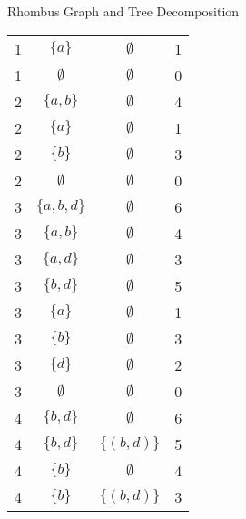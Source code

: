 \documentclass{beamer}
\begin{document}
\begin{frame}{Rhombus Graph and Tree Decomposition}
\begin{minipage}{0.35\textwidth}
\begin{tabular}{|c| >{\small}c | >{\small}c | >{\small}c |}
    \hline
    1 & \( \{ a \} \) & \( \emptyset \) & 1 \\
    1 & \( \emptyset \) & \( \emptyset \) & 0 \\
    \hline
    2 & \( \{ a, b \} \) & \( \emptyset \) & 4 \\
    2 & \( \{ a \} \) & \( \emptyset \) & 1 \\
    2 & \( \{ b \} \) & \( \emptyset \) & 3 \\
    2 & \( \emptyset \) & \( \emptyset \) & 0 \\
    \hline
    3 & \( \{ a, b, d \} \) & \( \emptyset \) & 6 \\
    3 & \( \{ a, b \} \) & \( \emptyset \) & 4 \\
    3 & \( \{ a, d \} \) & \( \emptyset \) & 3 \\
    3 & \( \{ b, d \} \) & \( \emptyset \) & 5 \\
    3 & \( \{ a \} \) & \( \emptyset \) & 1 \\
    3 & \( \{ b \} \) & \( \emptyset \) & 3 \\
    3 & \( \{ d \} \) & \( \emptyset \) & 2 \\
    3 & \( \emptyset \) & \( \emptyset \) & 0 \\
    \hline
    4 & \( \{ b, d \} \) & \( \emptyset \) & 6 \\
    4 & \( \{ b, d \} \) & \( \{ (b, d) \} \) & 5 \\
    4 & \( \{ b \} \) & \( \emptyset \) & 4 \\
    4 & \( \{ b \} \) & \( \{ (b, d) \} \) & 3 \\


\end{tabular}
\end{minipage}
\end{frame}
\end{document}
